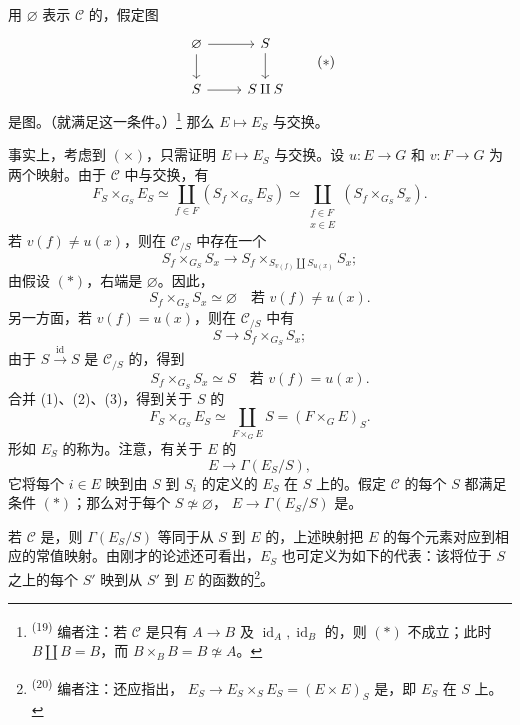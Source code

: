 用 $\varnothing$ 表示 $\mathcal C$ 的，假定图
\[
\begin{tikzcd}
\varnothing\arrow[r]\arrow[d]&S\arrow[d]\\
S\arrow[r]&S\amalg S
\end{tikzcd}\tag{$*$}
\]
是图。（就满足这一条件。）\footnote{\textsuperscript{(19)} 编者注：若 $\mathcal C$ 是只有 $A\to B$ 及 $\operatorname{id}_A,\operatorname{id}_B$ 的，则 $(*)$ 不成立；此时 $B\amalg B=B$，而 $B\times_BB=B\not\simeq A$。} 那么 $E\mapsto E_S$ 与交换。

事实上，考虑到 $(\times)$，只需证明 $E\mapsto E_S$ 与交换。设 $u:E\to G$ 和 $v:F\to G$ 为两个映射。由于 $\mathcal C$ 中与交换，有
\[
F_S\times_{G_S}E_S\simeq\coprod_{f\in F}(S_f\times_{G_S}E_S)
\simeq\coprod_{\substack{f\in F\\x\in E}}(S_f\times_{G_S}S_x).\tag{1}
\]
若 $v(f)\ne u(x)$，则在 $\mathcal C_{/S}$ 中存在一个
\[
S_f\times_{G_S}S_x\longrightarrow S_f\times_{S_{v(f)}\amalg S_{u(x)}}S_x;
\]
由假设 $(*)$，右端是 $\varnothing$。因此，
\[
S_f\times_{G_S}S_x\simeq\varnothing\quad\text{若 }v(f)\ne u(x).\tag{2}
\]
另一方面，若 $v(f)=u(x)$，则在 $\mathcal C_{/S}$ 中有
\[
S\longrightarrow S_f\times_{G_S}S_x;
\]
由于 $S\xrightarrow{\operatorname{id}}S$ 是 $\mathcal C_{/S}$ 的，得到
\[
S_f\times_{G_S}S_x\simeq S\quad\text{若 }v(f)=u(x).\tag{3}
\]
合并 (1)、(2)、(3)，得到关于 $S$ 的
\[
F_S\times_{G_S}E_S\simeq\coprod_{F\times_GE}S=(F\times_GE)_S.
\]
形如 $E_S$ 的称为。注意，有关于 $E$ 的
\[
E\longrightarrow\Gamma(E_S/S),
\]
它将每个 $i\in E$ 映到由 $S$ 到 $S_i$ 的定义的 $E_S$ 在 $S$ 上的。假定 $\mathcal C$ 的每个 $S$ 都满足条件 $(*)$；那么对于每个 $S\not\simeq\varnothing$， $E\to\Gamma(E_S/S)$ 是。

若 $\mathcal C$ 是，则 $\Gamma(E_S/S)$ 等同于从 $S$ 到 $E$ 的，上述映射把 $E$ 的每个元素对应到相应的常值映射。由刚才的论述还可看出，$E_S$ 也可定义为如下的代表：该将位于 $S$ 之上的每个 $S'$ 映到从 $S'$ 到 $E$ 的函数的\footnote{\textsuperscript{(20)} 编者注：还应指出， $E_S\to E_S\times_SE_S=(E\times E)_S$ 是，即 $E_S$ 在 $S$ 上。}。

